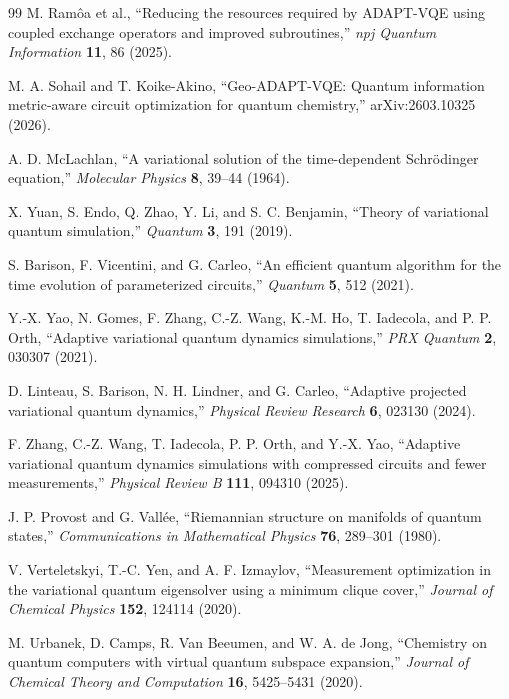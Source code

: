 \documentclass[
  reprint,
  amsmath,
  amssymb,
  aps,
  pra,
  nofootinbib,
  superscriptaddress,
  floatfix
]{revtex4-2}
\begin{document}
\begin{thebibliography}{99}
M. Ram\^oa et al.,
``Reducing the resources required by ADAPT-VQE using coupled exchange operators and improved subroutines,''
\emph{npj Quantum Information} \textbf{11}, 86 (2025).

M. A. Sohail and T. Koike-Akino,
``Geo-ADAPT-VQE: Quantum information metric-aware circuit optimization for quantum chemistry,''
arXiv:2603.10325 (2026).

A. D. McLachlan,
``A variational solution of the time-dependent Schr\"odinger equation,''
\emph{Molecular Physics} \textbf{8}, 39--44 (1964).

X. Yuan, S. Endo, Q. Zhao, Y. Li, and S. C. Benjamin,
``Theory of variational quantum simulation,''
\emph{Quantum} \textbf{3}, 191 (2019).

S. Barison, F. Vicentini, and G. Carleo,
``An efficient quantum algorithm for the time evolution of parameterized circuits,''
\emph{Quantum} \textbf{5}, 512 (2021).

Y.-X. Yao, N. Gomes, F. Zhang, C.-Z. Wang, K.-M. Ho, T. Iadecola, and P. P. Orth,
``Adaptive variational quantum dynamics simulations,''
\emph{PRX Quantum} \textbf{2}, 030307 (2021).

D. Linteau, S. Barison, N. H. Lindner, and G. Carleo,
``Adaptive projected variational quantum dynamics,''
\emph{Physical Review Research} \textbf{6}, 023130 (2024).

F. Zhang, C.-Z. Wang, T. Iadecola, P. P. Orth, and Y.-X. Yao,
``Adaptive variational quantum dynamics simulations with compressed circuits and fewer measurements,''
\emph{Physical Review B} \textbf{111}, 094310 (2025).

J. P. Provost and G. Vall\'ee,
``Riemannian structure on manifolds of quantum states,''
\emph{Communications in Mathematical Physics} \textbf{76}, 289--301 (1980).

V. Verteletskyi, T.-C. Yen, and A. F. Izmaylov,
``Measurement optimization in the variational quantum eigensolver using a minimum clique cover,''
\emph{Journal of Chemical Physics} \textbf{152}, 124114 (2020).

M. Urbanek, D. Camps, R. Van Beeumen, and W. A. de Jong,
``Chemistry on quantum computers with virtual quantum subspace expansion,''
\emph{Journal of Chemical Theory and Computation} \textbf{16}, 5425--5431 (2020).


\end{thebibliography}
\end{document}
